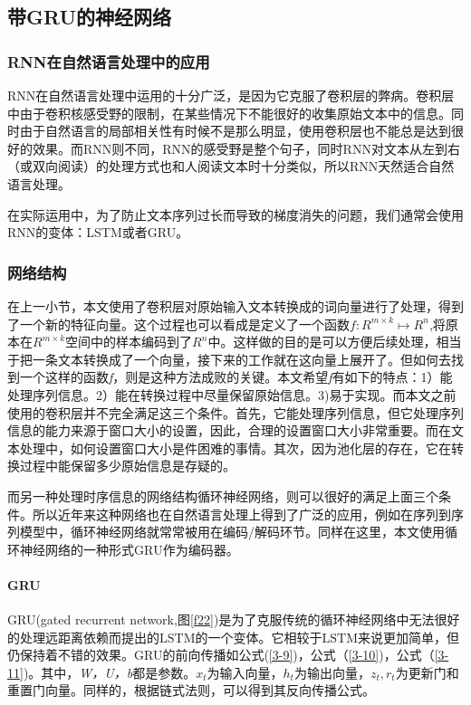 \subsection{带GRU的神经网络}
\subsubsection{RNN在自然语言处理中的应用}
RNN在自然语言处理中运用的十分广泛，是因为它克服了卷积层的弊病。卷积层中由于卷积核感受野的限制，在某些情况下不能很好的收集原始文本中的信息。同时由于自然语言的局部相关性有时候不是那么明显，使用卷积层也不能总是达到很好的效果。而RNN则不同，RNN的感受野是整个句子，同时RNN对文本从左到右（或双向阅读）的处理方式也和人阅读文本时十分类似，所以RNN天然适合自然语言处理。

在实际运用中，为了防止文本序列过长而导致的梯度消失的问题，我们通常会使用RNN的变体：LSTM或者GRU。
\subsubsection{网络结构}
在上一小节，本文使用了卷积层对原始输入文本转换成的词向量进行了处理，得到了一个新的特征向量。这个过程也可以看成是定义了一个函数\(f:R^{m\times k}\mapsto R^n\),将原本在\(R^{m\times k}\)空间中的样本编码到了\(R^n\)中。这样做的目的是可以方便后续处理，相当于把一条文本转换成了一个向量，接下来的工作就在这向量上展开了。但如何去找到一个这样的函数\textit{f}，则是这种方法成败的关键。本文希望\textit{f}有如下的特点：1）能处理序列信息。2）能在转换过程中尽量保留原始信息。3)易于实现。而本文之前使用的卷积层并不完全满足这三个条件。首先，它能处理序列信息，但它处理序列信息的能力来源于窗口大小的设置，因此，合理的设置窗口大小非常重要。而在文本处理中，如何设置窗口大小是件困难的事情。其次，因为池化层的存在，它在转换过程中能保留多少原始信息是存疑的。

而另一种处理时序信息的网络结构循环神经网络，则可以很好的满足上面三个条件。所以近年来这种网络也在自然语言处理上得到了广泛的应用，例如在序列到序列模型中，循环神经网络就常常被用在编码/解码环节。同样在这里，本文使用循环神经网络的一种形式$\mathrm{GRU}$\cite{DBLP:journals/corr/ChungGCB14}作为编码器。

\paragraph{GRU}
GRU(gated recurrent network,图\ref{f22})是为了克服传统的循环神经网络中无法很好的处理远距离依赖而提出的$\mathrm{LSTM}$的一个变体。它相较于$\mathrm{LSTM}$来说更加简单，但仍保持着不错的效果\cite{DBLP:journals/corr/ChungGCB14}。GRU的前向传播如公式(\ref{3-9})，公式（\ref{3-10})，公式（\ref{3-11})。其中，\textit{W，U，b}都是参数。\(x_t\)为输入向量，\(h_t\)为输出向量，\(z_t,r_t\)为更新门和重置门向量。同样的，根据链式法则，可以得到其反向传播公式。

